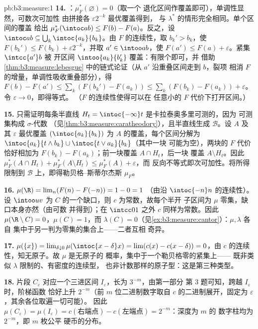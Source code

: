 \begin{solution}{pb:b3:measure:1}
\textbf{14.} ：$\mu_F^*(\varnothing) = 0$（取一个
退化区间作覆盖即可），单调性显然，可数次可加性
由拼接各 $\varepsilon2^{-k}$ 最优覆盖得到，
与 $\lambda^*$ 的情形完全相同。单个区间的覆盖
给出 $\mu_F^*(\intoc ab) \leq F(b) - F(a)$。反之，设
$\intoc ab \subseteq \bigcup_k\intoc{a_k}{b_k}$。由
$F$ 的连续性，取 $b_k' > b_k$，使 $F(b_k') \leq F(b_k) +
\varepsilon2^{-k}$，并取 $a' \in \intoo ab$，使 $F(a') \leq
F(a) + \varepsilon$。紧集 $\intcc{a'}b$ 被
开区间 $\intoo{a_k}{b_k'}$ 覆盖：有限个即可，并
借助 \cref{thm:b3:measure:lebesgue} 中的链式论证（从
$a'$ 沿重叠区间走到 $b$，裂项
相消 $F$ 的增量，单调性吸收重叠部分），得 $F(b)
- F(a') \leq \sum_k(F(b_k') - F(a_k)) \leq \sum_k(F(b_k) -
F(a_k)) + \varepsilon$。令 $\varepsilon \to 0$，即得等式。
（$F$ 的连续性使得可以在
任意小的 $F$ 代价下打开区间。）

\textbf{15.} 只需证明每条半直线 $H_t =
\intoc{-\infty}t$ 是卡拉泰奥多里可测的，因为
可测集构成 $\sigma$-代数
（见\cref{thm:b3:measure:caratheodory}），且半直线生成
$\mathcal B$。设 $A$ 及其 $\varepsilon$ 最优覆盖
$(\intoc{a_k}{b_k})$ 为 $A$ 的覆盖，每个区间分解为
$\intoc{a_k}{t\wedge b_k} \cup \intoc{t \vee a_k}{b_k}$（其中一块
可能为空），两块的 $F$ 代价恰好相加为
$F(b_k) - F(a_k)$；前一块覆盖 $A \cap H_t$，后一块
覆盖 $A \setminus H_t$。因此 $\mu_F^*(A\cap H_t) +
\mu_F^*(A\setminus H_t) \leq \mu_F^*(A) + \varepsilon$，而
反向不等式即次可加性。将所得
限制到 $\mathcal B$ 上，即得勒贝格–斯蒂尔杰斯
 $\mu_F$。

\textbf{16.} $\mu(\R) = \lim_n(F(n) - F(-n)) = 1 - 0 = 1$
（由沿 $\intoc{-n}n$ 的连续性）。
设 $\intoo uv$ 为 $C$ 的一个缺口，则 $c$ 为常数，故每个半开
子区间为 $\mu$ 零集，缺口本身亦然（由可数
并得到）；在 $\intcc01$ 之外 $c$ 同样为常数。因此
$\mu(\R\setminus C) = 0$，$\mu(C) = 1$，而 $\lambda(C) =
0$（见\cref{ex:b3:measure:cantor}）：$\mu, \lambda$ 各自
集中于另一判为零集的集合上——二者互相
奇异。

\textbf{17.} $\mu(\{x\}) = \lim_{\delta\downarrow0}
\mu(\intoc{x-\delta}x) = \lim(c(x) - c(x-\delta)) = 0$，由
$c$ 的连续性，知无原子。故 $\mu$ 是无原子的
概率，集中于一个勒贝格零的紧集上——
既非类似 $\lambda$ 限制的、有密度的连续型，
也非计数那样的原子型：这是第三种类型。

\textbf{18.} 片段 $C_\varepsilon$ 对应一个三进区间
$I_\varepsilon$，长为 $3^{-m}$，由第一部分
第 3 题可知，跨越 $I_\varepsilon$ 时，阶梯函数
恰好上升 $2^{-m}$（前 $m$ 位二进制数字取自 $c$
的二进制展开，固定为 $\varepsilon$，其余各位取遍一切可能）。
因此 $\mu(C_\varepsilon) = \mu(I_\varepsilon) =
c(\text{右端点}) - c(\text{左端点}) = 2^{-m}$：深度为 $m$ 的
数字柱均为 $2^{-m}$，即 $m$ 枚公平
硬币的分布。


\end{solution}
